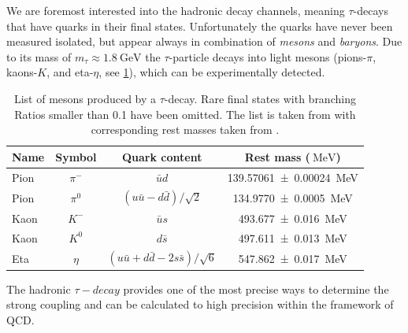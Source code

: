 \documentclass[../../index.tex]{subfiles}
\begin{document}
We are foremost interested into the hadronic decay channels, meaning
$\tau$-decays that have quarks in their final states. Unfortunately the quarks
have never been measured isolated, but appear always in combination of \textit{mesons}
and \textit{baryons}. Due to its mass of $m_\tau \approx
\SI{1.8}{\giga\electronvolt}$ the $\tau$-particle decays into light mesons
(pions-$\pi$, kaons-$K$, and eta-$\eta$, see \cref{table:lightMesons}), which
can be experimentally detected.
\begin{table}
  \centering
  \begin{tabular}{l c c c}
    \toprule
    Name & Symbol & Quark content & Rest mass ($\SI{}{\mega\electronvolt}$) \\
    \midrule
    Pion & $\pi^-$ & $\bar u d$ & \SI{139.57061 \pm 0.00024}{\mega\electronvolt}  \\
    Pion & $\pi^0$ & $(u \bar u - d \bar d)/\sqrt{2}$ & \SI{134.9770\pm0.0005}{\mega\electronvolt} \\
    Kaon & $K^-$ & $\bar u s$ & \SI{493.677\pm0.016}{\mega\electronvolt} \\
    Kaon & $K^0$ & $d \bar s$ & \SI{497.611\pm0.013}{\mega\electronvolt} \\
    Eta & $\eta$ & $(u \bar u + d \bar d - 2 s \bar s)/\sqrt{6}$ & \SI{547.862\pm0.017}{\mega\electronvolt} \\
  \end{tabular}
  \caption{List of mesons produced by a $\tau$-decay. Rare final states with
    branching Ratios smaller than 0.1 have been omitted. The list is taken from 
    \cite{Davier2006} with corresponding rest masses taken from \cite{PDG2018}.}
  \label{table:lightMesons}
\end{table}

The hadronic $\tau-decay$ provides one of the most precise ways to determine the
strong coupling \cite{Pich2016} and can be calculated to high precision within
the framework of QCD.
\end{document}
